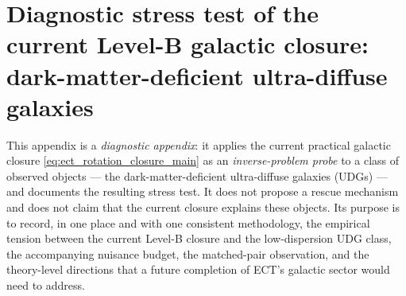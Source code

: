 %
%

\section{Diagnostic stress test of the current Level-B galactic
closure: dark-matter-deficient ultra-diffuse galaxies}
\label{app:udg_stress_test}

This appendix is a \emph{diagnostic appendix}: it applies the current
practical galactic closure
\eqref{eq:ect_rotation_closure_main} as an \emph{inverse-problem
probe} to a class of observed objects --- the dark-matter-deficient
ultra-diffuse galaxies (UDGs) --- and documents the resulting
stress test.  It does not propose a rescue mechanism and does not
claim that the current closure explains these objects.  Its purpose
is to record, in one place and with one consistent methodology, the
empirical tension between the current Level-B closure and the
low-dispersion UDG class, the accompanying nuisance budget, the
matched-pair observation, and the theory-level directions that a
future completion of ECT's galactic sector would need to address.

